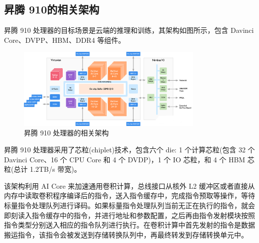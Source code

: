 \subsection{昇腾 910的相关架构}

昇腾 910 处理器的目标场景是云端的推理和训练，其架构如图所示，包含 Davinci Core、DVPP、HBM、DDR4 等组件。

\begin{figure}[htbp]
	\centering
	\includegraphics[width=0.8\textwidth]{img/7.png} %
	\caption{昇腾 910 处理器的相关架构 }
	\label{fig:example}
\end{figure}

昇腾 910 处理器采用了芯粒(chiplet)技术，包含六个 die: 1 个计算芯粒(包含 32 个 Davinci Core、16 个 CPU Core 和 4 个 DVDP)，1 个 IO 芯粒，和 4 个 HBM 芯粒(总计 1.2TB/s 带宽)。

该架构利用 AI Core 来加速通用卷积计算，总线接口从核外 L2 缓冲区或者直接从内存中读取卷积程序编译后的指令，送入指令缓存中，完成指令预取等操作，等待标量指令处理队列进行译码。如果标量指令处理队列当前无正在执行的指令，就会即刻读入指令缓存中的指令，并进行地址和参数配置，之后再由指令发射模块按照指令类型分别送入相应的指令队列进行执行。在卷积计算中首先发射的指令是数据搬运指令，该指令会被发送到存储转换队列中，再最终转发到存储转换单元中。


